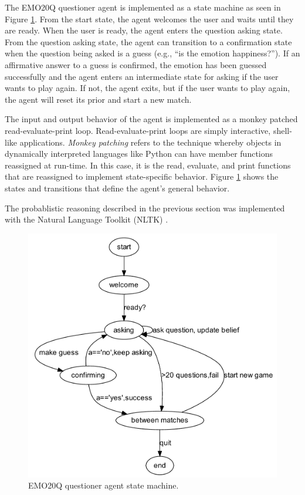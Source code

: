 \documentclass[a4paper]{article}
\begin{document}
The EMO20Q questioner agent is implemented as a state machine as seen in
Figure \ref{statemachine}.  From the start state, the agent welcomes the user
and waits until they are ready.  When the user is ready, the agent enters the
question asking state.  From the question asking state, the agent can
transition to a confirmation state when the question being asked is a guess
(e.g., ``is the emotion happiness?'').  If an affirmative answer to a guess is
confirmed, the emotion has been guessed successfully and the agent enters an
intermediate state for asking if the user wants to play again.  If not, the
agent exits, but if the user wants to play again, the agent will reset its
prior and start a new match.  

The input and output behavior of the agent is implemented as a monkey patched
read-evaluate-print loop.  Read-evaluate-print loops are simply interactive,
shell-like applications.  {\em Monkey patching} refers to the technique
whereby objects in dynamically interpreted languages like Python can have
member functions reassigned at run-time.  In this case, it is the read,
evaluate, and print functions that are reassigned to implement state-specific
behavior.  Figure \ref{statemachine} shows the states and transitions that
define the agent's general behavior.

The probablistic reasoning described in the previous section was implemented
with the Natural Language Toolkit (NLTK) \cite{BirdKleinLoper09}. 

\begin{figure}[t]
  \centering
  \includegraphics[scale=.45]{statemachine}
  \caption{EMO20Q questioner agent state machine.}
  \label{statemachine}

\end{figure}
\end{document}
